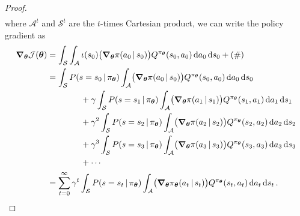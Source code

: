 \begin{proof}
\begin{align}
			\end{align}
			where \(\mathcal{A}^t\) and \(\mathcal{S}^t\) are the \(t\)-times Cartesian product, we can write the policy gradient as
			\begin{align}
				\grad_{\bm{\theta}} \mathcal{J}(\bm{\theta})
					&= \int_\mathcal{S} \int_\mathcal{A} \iota(s_0) \bigl( \grad_{\bm{\theta}} \pi(a_0 \,\vert\, s_0) \bigr) Q^{\pi_{\bm{\theta}}}(s_0, a_0) \dd{a_0} \dd{s_0} + (\#) \\
					&= \int_\mathcal{S} P(s = s_0 \,\vert\, \pi_{\bm{\theta}}) \int_\mathcal{A} \bigl( \grad_{\bm{\theta}} \pi(a_0 \,\vert\, s_0) \bigr) Q^{\pi_{\bm{\theta}}}(s_0, a_0) \dd{a_0} \dd{s_0} \\&\qquad\qquad
						+ \gamma \int_\mathcal{S} P(s = s_1 \,\vert\, \pi_{\bm{\theta}}) \int_\mathcal{A} \bigl( \grad_{\bm{\theta}} \pi(a_1 \,\vert\, s_1) \bigr) Q^{\pi_{\bm{\theta}}}(s_1, a_1) \dd{a_1} \dd{s_1} \\&\qquad\qquad
						+ \gamma^2 \int_\mathcal{S} P(s = s_2 \,\vert\, \pi_{\bm{\theta}}) \int_\mathcal{A} \bigl( \grad_{\bm{\theta}} \pi(a_2 \,\vert\, s_2) \bigr) Q^{\pi_{\bm{\theta}}}(s_2, a_2) \dd{a_2} \dd{s_2} \\&\qquad\qquad
						+ \gamma^3 \int_\mathcal{S} P(s = s_3 \,\vert\, \pi_{\bm{\theta}}) \int_\mathcal{A} \bigl( \grad_{\bm{\theta}} \pi(a_3 \,\vert\, s_3) \bigr) Q^{\pi_{\bm{\theta}}}(s_3, a_3) \dd{a_3} \dd{s_3} \\&\qquad\qquad
						+ \cdots \\
					&= \sum_{t = 0}^{\infty} \gamma^t \int_{\mathcal{S}} P(s = s_t \,\vert\, \pi_{\bm{\theta}}) \int_{\mathcal{A}} \bigl( \grad_{\bm{\theta}} \pi_{\bm{\theta}}(a_t \,\vert\, s_t) \bigr) Q^{\pi_{\bm{\theta}}}(s_t, a_t) \dd{a_t} \dd{s_t}.
			\end{align}


\end{proof}
